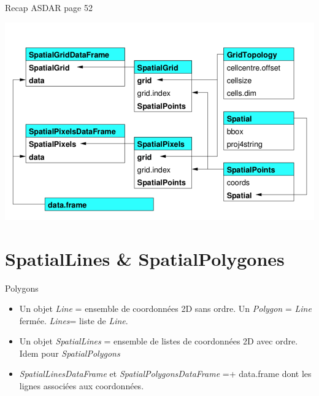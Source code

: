 \documentclass[8pt,ignorenonframetext,]{beamer}
\providecommand{\tightlist}{%
\setlength{\itemsep}{0pt}\setlength{\parskip}{0pt}}
\begin{document}
\begin{frame}{Recap ASDAR page 52}

\begin{center}
  \includegraphics[width=1\textwidth]{figSpatialGrids.png}
\end{center}

\end{frame}

\section{SpatialLines \&
SpatialPolygones}\label{spatiallines-spatialpolygones}

\begin{frame}{Polygons}

\begin{itemize}
\tightlist
\item
  Un objet \emph{Line} = ensemble de coordonnées 2D sans ordre. Un
  \emph{Polygon} = \emph{Line} fermée. \emph{Lines}= liste de
  \emph{Line}.
\item
  Un objet \emph{SpatialLines} = ensemble de listes de coordonnées 2D
  avec ordre. Idem pour \emph{SpatialPolygons}
\item
  \emph{SpatialLinesDataFrame} et \emph{SpatialPolygonsDataFrame} =+
  data.frame dont les lignes associées aux coordonnées.
\end{itemize}

\end{frame}
\end{document}
